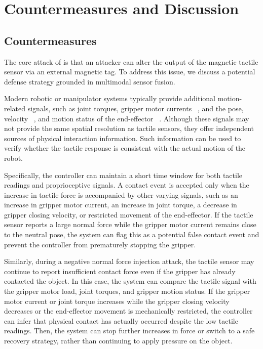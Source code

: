 \section{Countermeasures and Discussion}
\label{sec:Countermeasures}

\subsection{Countermeasures}
The core attack of {\name} is that an attacker can alter the output of the magnetic tactile sensor via an external magnetic tag.
To address this issue, we discuss a potential defense strategy grounded in multimodal sensor fusion.

Modern robotic or manipulator systems typically provide additional motion-related signals, such as joint torques, gripper motor currents ~\cite{frankaRobotState}, and the pose, velocity ~\cite{urRTDEGuide}, and motion status of the end-effector ~\cite{robotiq2fManual}. 
Although these signals may not provide the same spatial resolution as tactile sensors, they offer independent sources of physical interaction information. 
Such information can be used to verify whether the tactile response is consistent with the actual motion of the robot.

Specifically, the controller can maintain a short time window for both tactile readings and proprioceptive signals. 
A contact event is accepted only when the increase in tactile force is accompanied by other varying signals, such as an increase in gripper motor current, an increase in joint torque, a decrease in gripper closing velocity, or restricted movement of the end-effector.
If the tactile sensor reports a large normal force while the gripper motor current remains close to the neutral pose, the system can flag this as a potential false contact event and prevent the controller from prematurely stopping the gripper.

Similarly, during a negative normal force injection attack, the tactile sensor may continue to report insufficient contact force even if the gripper has already contacted the object. 
In this case, the system can compare the tactile signal with the gripper motor load, joint torques, and gripper motion status. 
If the gripper motor current or joint torque increases while the gripper closing velocity decreases or the end-effector movement is mechanically restricted, the controller can infer that physical contact has actually occurred despite the low tactile readings. 
Then, the system can stop further increases in force or switch to a safe recovery strategy, rather than continuing to apply pressure on the object.

